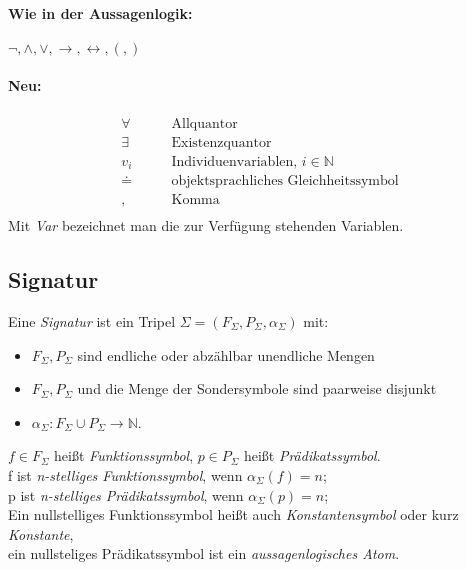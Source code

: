 \documentclass{article}
\begin{document}
\paragraph{Wie in der Aussagenlogik:}
$\lnot, \land, \lor, \rightarrow, \leftrightarrow, (, )$
\paragraph{Neu:} 
\begin{align*}
    \forall \qquad &\text{Allquantor} \\
    \exists  \qquad &\text{Existenzquantor} \\
    v_i  \qquad &\text{Individuenvariablen, } i \in \mathbb{N} \\
    \doteq  \qquad &\text{objektsprachliches Gleichheitssymbol} \\
    ,  \qquad &\text{Komma} \\
\end{align*}
Mit \textit{Var} bezeichnet man die zur Verf\"ugung stehenden Variablen.

\subsection{Signatur}
Eine \textit{Signatur} ist ein Tripel $\Sigma = ( F_\Sigma, P_\Sigma,
\alpha_\Sigma)$ mit:
\begin{itemize}
    \item $F_\Sigma, P_\Sigma$ sind endliche oder
        abz\"ahlbar unendliche Mengen
    \item $F_\Sigma, P_\Sigma$ und die Menge der Sondersymbole
        sind paarweise disjunkt
    \item $\alpha_\Sigma: F_\Sigma \cup P_\Sigma \rightarrow \mathbb{N}$.
\end{itemize}
$f \in F_\Sigma$ hei{\ss}t \textit{Funktionssymbol}, 
$p \in P_\Sigma$ hei{\ss}t \textit{Pr\"adikatssymbol}.\\
f ist \textit{n-stelliges Funktionssymbol}, wenn $\alpha_\Sigma(f) = n$; \\
p ist \textit{n-stelliges Pr\"adikatssymbol}, wenn $\alpha_\Sigma(p) = n$; \\
Ein nullstelliges Funktionssymbol hei{\ss}t auch \textit{Konstantensymbol}
oder kurz \textit{Konstante}, \\
ein nullsteliges Pr\"adikatssymbol ist ein \textit{aussagenlogisches Atom}.
\end{document}
